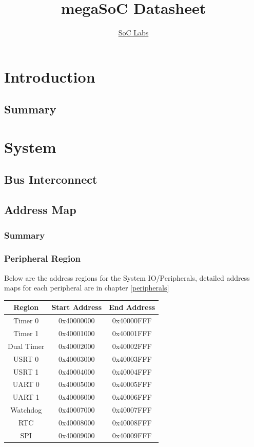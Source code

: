 \documentclass{report}
\title{megaSoC Datasheet}
\author{\href{http://www.soclabs.org}{SoC Labs}}
\begin{document}
\maketitle


\tableofcontents
\clearpage
\chapter{Introduction}

\section{Summary}


\chapter{System}

\section{Bus Interconnect}

\section{Address Map}
\subsection{Summary}



\subsection{Peripheral Region}
Below are the address regions for the System IO/Peripherals, detailed address maps for each peripheral are in chapter \ref{peripherals}
\begin{center}
    \begin{tabular}{||c | c | c ||}
        \hline
        Region & Start Address & End Address \\ 
        \hline\hline
        Timer 0     & 0x40000000 & 0x40000FFF \\ \hline
        Timer 1     & 0x40001000 & 0x40001FFF \\ \hline
        Dual Timer  & 0x40002000 & 0x40002FFF \\ \hline
        USRT 0      & 0x40003000 & 0x40003FFF \\ \hline
        USRT 1      & 0x40004000 & 0x40004FFF \\ \hline
        UART 0      & 0x40005000 & 0x40005FFF \\ \hline
        UART 1      & 0x40006000 & 0x40006FFF \\ \hline
        Watchdog    & 0x40007000 & 0x40007FFF \\ \hline
        RTC         & 0x40008000 & 0x40008FFF \\ \hline
        SPI         & 0x40009000 & 0x40009FFF \\ 
        \hline
    \end{tabular}
\end{center}
\end{document}
